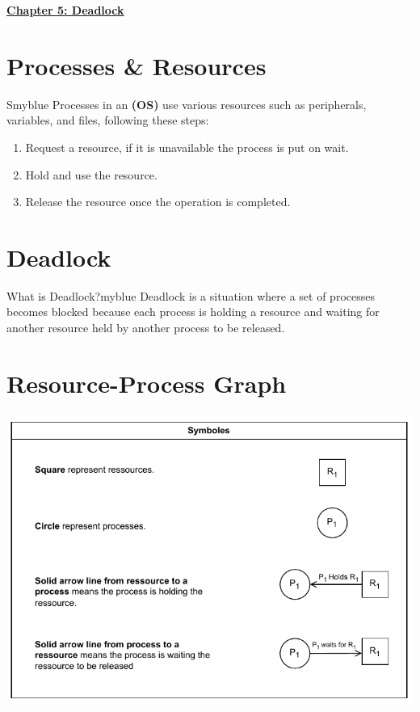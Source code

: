 \newpage
\null
\vspace{0.15cm}

\begin{center}
    \Huge{\textbf{\underline{Chapter 5: Deadlock}}}
\end{center}

\vspace{0.25cm}

\setcounter{section}{0}

\section{Processes \& Resources}
\begin{prettyBox}{S}{myblue}
Processes in an \textbf{(OS)} use various resources such as peripherals, variables, and files, following these steps:
\begin{enumerate}
    \item Request a resource, if it is unavailable the process is put on wait.
    \item Hold and use the resource.
    \item Release the resource once the operation is completed.
\end{enumerate}
\end{prettyBox}

\vspace{0.25cm}

\section{Deadlock}
\begin{prettyBox}{What is Deadlock?}{myblue}
Deadlock is a situation where a set of processes becomes blocked because each process is holding a resource and waiting for another resource held by another process to be released.
\end{prettyBox}

\vspace{0.15cm}

\section{Resource-Process Graph}
\begin{center}
    \includegraphics{Chapters/Diagram/Deadlock/sym.drawio.pdf}
\end{center}

